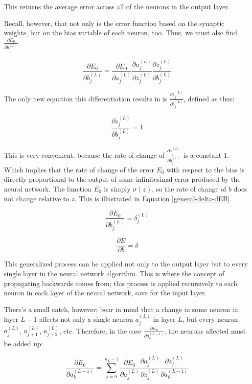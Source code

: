 \documentclass[12pt]{article}
\begin{document}
This returns the average error across all of the neurons in the output layer.

Recall, however, that not only is the error function based on the synaptic weights, but on the bias variable of each neuron, too. Thus, we must also find $\frac{\partial E_0}{\partial b_j^{(L)}}$

\[ \frac{\partial E_0}{\partial b_j^{(L)}} = \frac{\partial E_0}{\partial a_j^{(L)}} \frac{\partial a_j^{(L)}}{\partial z_j^{(L)}} \frac{\partial z_j^{(L)}}{\partial b_j^{(L)}}\]

The only new equation this differentiation results in is $\frac{\partial z_j^{(L)}}{\partial b_j^{(L)}}$, defined as thus:

\[\frac{\partial z_j^{(L)}}{\partial b_j^{(L)}} = 1 \]

This is very convenient, because the rate of change of $\frac{\partial z_j^{(L)}}{\partial b_j^{(L)}}$ is a constant 1. Which implies that the rate of change of the error $E_0$ with respect to the bias is directly proportional to the output of some infinitesimal error produced by the neural network. The function $E_0$ is simply $\sigma(z)$, so the rate of change of $b$ does not change relative to $z$. This is illustrated in Equation \ref{general-delta-dEB}.

\[ \frac{\partial E_0}{\partial b_j^{(L)}} = \delta_j^{(L)}\]

\begin{equation} \label{general-delta-dEB}
  \frac{\partial E}{\partial b} = \delta
\end{equation}


This generalized process can be applied not only to the output layer but to every single layer in the neural network algorithm. This is where the concept of propagating backwards comes from; this process is applied recursively to each neuron in each layer of the neural network, save for the input layer.

There's a small catch, however; bear in mind that a change in some neuron in layer $L-1$ affects not only a single neuron $a_j^{(L)}$ in layer $L$, but every neuron $a_j^{(L)}$, $a_{j+1}^{(L)}$, $a_{j+2}^{(L)}$, etc. Therefore, in the case $ \frac{\partial E_0}{\partial a_k^{(L-1)}} $, the neurons affected must be added up:

\[ \frac{\partial E_0}{\partial a_k^{(L-1)}} = \sum_{j=0}^{n_L-1} \frac{\partial E_0}{\partial a_j^{(L)}} \frac{\partial a_j^{(L)}}{\partial z_j^{(L)}} \frac{\partial z_j^{(L)}}{\partial a_k^{(L-1)}} \]
\end{document}
